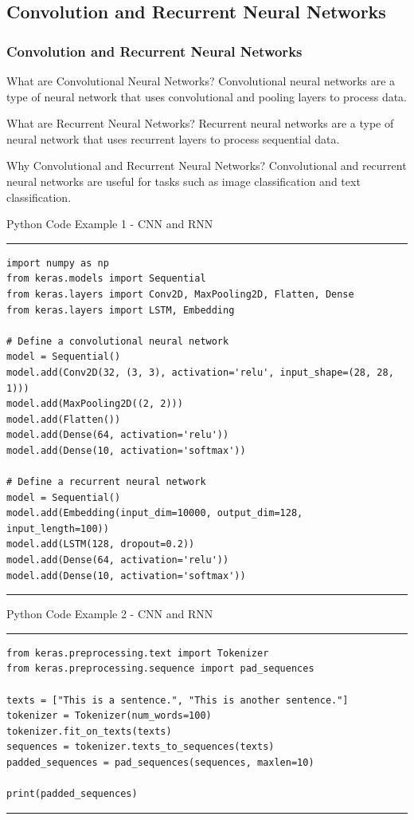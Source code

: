 \documentclass[aspectratio=169, hideothersubsections]{beamer}
\begin{document}
\subsection{Convolution and Recurrent Neural Networks}

\begin{frame}
  \frametitle{Convolution and Recurrent Neural Networks}
  \begin{block}{What are Convolutional Neural Networks?}
    Convolutional neural networks are a type of neural network that uses convolutional and pooling layers to process data.
  \end{block}
  \begin{block}{What are Recurrent Neural Networks?}
    Recurrent neural networks are a type of neural network that uses recurrent layers to process sequential data.
  \end{block}
  \begin{block}{Why Convolutional and Recurrent Neural Networks?}
    Convolutional and recurrent neural networks are useful for tasks such as image classification and text classification.
  \end{block}
\end{frame}

\begin{frame}[fragile]{Python Code Example 1 - CNN and RNN}
\rule{\textwidth}{1pt}
\scriptsize
\begin{verbatim}
import numpy as np
from keras.models import Sequential
from keras.layers import Conv2D, MaxPooling2D, Flatten, Dense
from keras.layers import LSTM, Embedding

# Define a convolutional neural network
model = Sequential()
model.add(Conv2D(32, (3, 3), activation='relu', input_shape=(28, 28, 1)))
model.add(MaxPooling2D((2, 2)))
model.add(Flatten())
model.add(Dense(64, activation='relu'))
model.add(Dense(10, activation='softmax'))

# Define a recurrent neural network
model = Sequential()
model.add(Embedding(input_dim=10000, output_dim=128, input_length=100))
model.add(LSTM(128, dropout=0.2))
model.add(Dense(64, activation='relu'))
model.add(Dense(10, activation='softmax'))
\end{verbatim}
\rule{\textwidth}{1pt}
\end{frame}

\begin{frame}[fragile]{Python Code Example 2 - CNN and RNN}
\rule{\textwidth}{1pt}
\scriptsize
\begin{verbatim}
from keras.preprocessing.text import Tokenizer
from keras.preprocessing.sequence import pad_sequences

texts = ["This is a sentence.", "This is another sentence."]
tokenizer = Tokenizer(num_words=100)
tokenizer.fit_on_texts(texts)
sequences = tokenizer.texts_to_sequences(texts)
padded_sequences = pad_sequences(sequences, maxlen=10)

print(padded_sequences)
\end{verbatim}
\rule{\textwidth}{1pt}
\end{frame}
\end{document}
